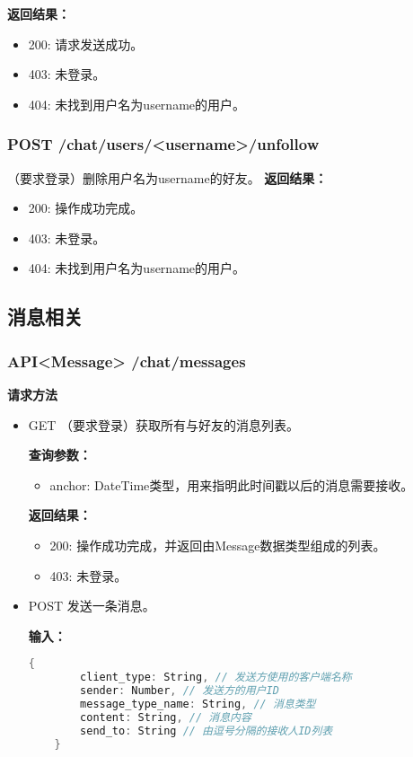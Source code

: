 \textbf{返回结果：}
\begin{itemize}
    \item 200: 请求发送成功。
    \item 403: 未登录。
    \item 404: 未找到用户名为username的用户。
\end{itemize}

\subsubsection{\textbf{POST} /chat/users/<username>/unfollow}
（要求登录）删除用户名为username的好友。
\textbf{返回结果：}
\begin{itemize}
    \item 200: 操作成功完成。
    \item 403: 未登录。
    \item 404: 未找到用户名为username的用户。
\end{itemize}

\subsection{消息相关}
\subsubsection{\textbf{API<Message>} /chat/messages}
\textbf{请求方法}
\begin{itemize}
    \item GET
    （要求登录）获取所有与好友的消息列表。

    \textbf{查询参数：}
    \begin{itemize}
        \item anchor: DateTime类型，用来指明此时间戳以后的消息需要接收。
    \end{itemize}

    \textbf{返回结果：}
    \begin{itemize}
    \item 200: 操作成功完成，并返回由Message数据类型组成的列表。
    \item 403: 未登录。
    \end{itemize}
    \item POST
    发送一条消息。

    \textbf{输入：}
    \begin{lstlisting}[language=C]
    {
        client_type: String, // 发送方使用的客户端名称
        sender: Number, // 发送方的用户ID
        message_type_name: String, // 消息类型
        content: String, // 消息内容
        send_to: String // 由逗号分隔的接收人ID列表
    }
    \end{lstlisting}
\end{itemize}


